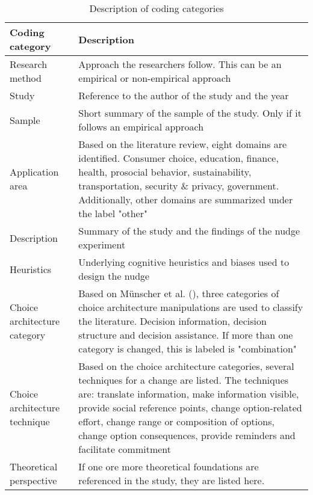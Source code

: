 \newpage


\begin{table}[h!]
\small
\centering
\begin{tabular}{|p{}|p{}|}
\hline
\textbf{Coding category} & \textbf{Description} \\ \hline
Research method & Approach the researchers follow. This can be an empirical or non-empirical approach \\ \hline
Study & Reference to the author of the study and the year \\ \hline
Sample & Short summary of the sample of the study. Only if it follows an empirical approach \\ \hline
Application area & Based on the literature review, eight domains are identified. Consumer choice, education, finance, health, prosocial behavior, sustainability, transportation, security \& privacy, government. Additionally, other domains are summarized under the label "other" \\ \hline
Description & Summary of the study and the findings of the nudge experiment \\ \hline
Heuristics & Underlying cognitive heuristics and biases used to design the nudge \\ \hline
Choice architecture category & Based on Münscher et al. (\citeyear{munscher_review_2016}), three categories of choice architecture manipulations are used to classify the literature. Decision information, decision structure and decision assistance. If more than one category is changed, this is labeled is "combination" \\ \hline
Choice architecture technique & Based on the choice architecture categories, several techniques for a change are listed. The techniques are: translate information, make information visible, provide social reference points, change option-related effort, change range or composition of options, change option consequences, provide reminders and facilitate commitment \\ \hline
Theoretical perspective & If one ore more theoretical foundations are referenced in the study, they are listed here. \\ \hline
\end{tabular}
\caption{Description of coding categories}
\end{table}
